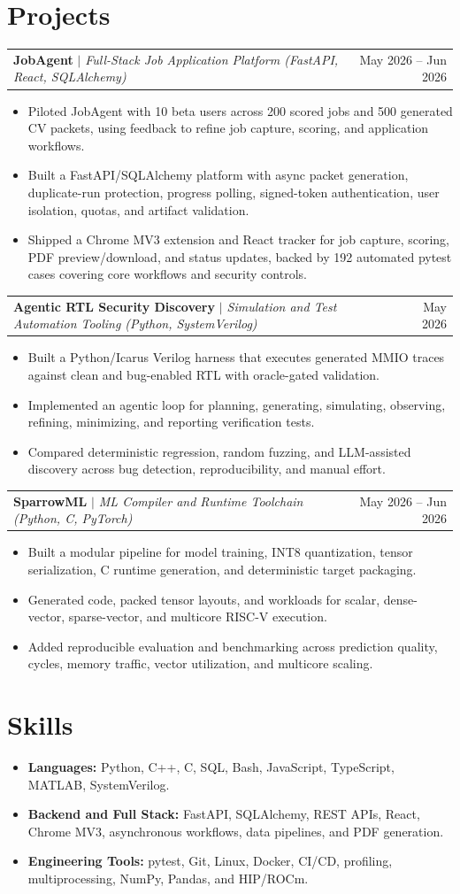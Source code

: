 \documentclass[10pt,letterpaper]{article}
\newcommand{\resumeItem}[1]{\item #1}
\newcommand{\resumeProjectHeading}[3]{\begin{tabularx}{\textwidth}{X r}\textbf{#1} \textit{#2} & #3 \\\end{tabularx}\vspace{0pt}}
\newenvironment{resumeItemList}{\begin{small}\begin{itemize}[leftmargin=*, itemsep=2pt, topsep=3pt, parsep=0pt]}{\end{itemize}\end{small}\vspace{4pt}}
\begin{document}
\section*{Projects}
\resumeProjectHeading{JobAgent}{$\mid$ Full-Stack Job Application Platform (FastAPI, React, SQLAlchemy)}{May 2026 -- Jun 2026}
\begin{resumeItemList}
\resumeItem{Piloted JobAgent with 10 beta users across 200 scored jobs and 500 generated CV packets, using feedback to refine job capture, scoring, and application workflows.}
\resumeItem{Built a FastAPI/SQLAlchemy platform with async packet generation, duplicate-run protection, progress polling, signed-token authentication, user isolation, quotas, and artifact validation.}
\resumeItem{Shipped a Chrome MV3 extension and React tracker for job capture, scoring, PDF preview/download, and status updates, backed by 192 automated pytest cases covering core workflows and security controls.}
\end{resumeItemList}
\resumeProjectHeading{Agentic RTL Security Discovery}{$\mid$ Simulation and Test Automation Tooling (Python, SystemVerilog)}{May 2026}
\begin{resumeItemList}
\resumeItem{Built a Python/Icarus Verilog harness that executes generated MMIO traces against clean and bug-enabled RTL with oracle-gated validation.}
\resumeItem{Implemented an agentic loop for planning, generating, simulating, observing, refining, minimizing, and reporting verification tests.}
\resumeItem{Compared deterministic regression, random fuzzing, and LLM-assisted discovery across bug detection, reproducibility, and manual effort.}
\end{resumeItemList}
\resumeProjectHeading{SparrowML}{$\mid$ ML Compiler and Runtime Toolchain (Python, C, PyTorch)}{May 2026 -- Jun 2026}
\begin{resumeItemList}
\resumeItem{Built a modular pipeline for model training, INT8 quantization, tensor serialization, C runtime generation, and deterministic target packaging.}
\resumeItem{Generated code, packed tensor layouts, and workloads for scalar, dense-vector, sparse-vector, and multicore RISC-V execution.}
\resumeItem{Added reproducible evaluation and benchmarking across prediction quality, cycles, memory traffic, vector utilization, and multicore scaling.}
\end{resumeItemList}
\vspace{-0.5em}
\section*{Skills}
\begin{resumeItemList}
\resumeItem{\textbf{Languages:} Python, C++, C, SQL, Bash, JavaScript, TypeScript, MATLAB, SystemVerilog.}
\resumeItem{\textbf{Backend and Full Stack:} FastAPI, SQLAlchemy, REST APIs, React, Chrome MV3, asynchronous workflows, data pipelines, and PDF generation.}
\resumeItem{\textbf{Engineering Tools:} pytest, Git, Linux, Docker, CI/CD, profiling, multiprocessing, NumPy, Pandas, and HIP/ROCm.}
\end{resumeItemList}
\end{document}
